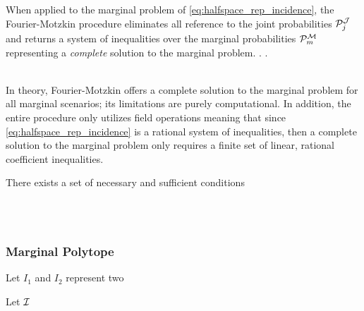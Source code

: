 \documentclass[aps, 10pt, english, twoside, pra, nofootinbib, longbibliography]{revtex4-1}
\begin{document}
    When applied to the marginal problem of \cref{eq:halfspace_rep_incidence}, the Fourier-Motzkin procedure eliminates all reference to the joint probabilities $\probvec^{\jointvar}_j$ and returns a system of inequalities over the marginal probabilities $\probvec^{\mscenario}_m$ representing a \textit{complete} solution to the marginal problem. . . \\

    \\

    \begin{remark}
        In theory, Fourier-Motzkin offers a complete solution to the marginal problem for all marginal scenarios; its limitations are purely computational. In addition, the entire procedure only utilizes field operations \cite{Abramsky_2012} meaning that since \cref{eq:halfspace_rep_incidence} is a rational system of inequalities, then a complete solution to the marginal problem only requires a finite set of linear, rational coefficient inequalities.
    \end{remark}

    \begin{theorem}
        There exists a set of necessary and sufficient conditions

    \end{theorem}



     \\
     \\
    \subsubsection{Marginal Polytope}
    \begin{definition}
        Let $I_{1}$ and $I_{2}$ represent two
    \end{definition}
    \begin{definition}
        Let $\mathcal{I}$
    \end{definition}

\end{document}
